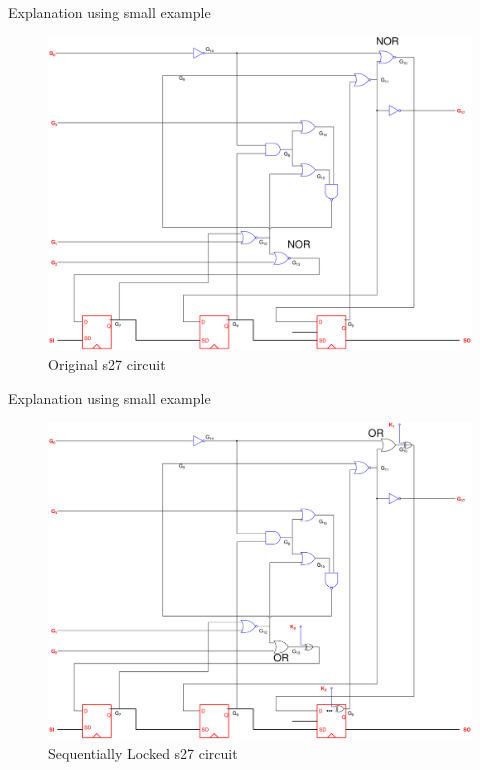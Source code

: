 \begin{frame}{Explanation using small example}
\begin{figure}
	\begin{center}
		\caption{Original s27 circuit}
		\label{fig:s27}
		\includegraphics[scale=0.15]{fig/s27_original.pdf}
	\end{center}
\end{figure}
\end{frame}

\begin{frame}{Explanation using small example}
\begin{figure}
	\begin{center}
		\caption{Sequentially Locked s27 circuit}
		\label{fig:s27-locked}
		\includegraphics[scale=0.15]{fig/s27_locked.pdf}
	\end{center}
\end{figure}
\end{frame}

